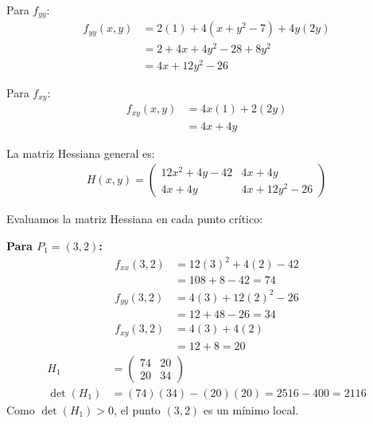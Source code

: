 \documentclass{article}
\begin{document}
Para $f_{yy}$:
\begin{align}
f_{yy}(x,y) &= 2(1) + 4(x + y^2 - 7) + 4y(2y) \\
&= 2 + 4x + 4y^2 - 28 + 8y^2 \\
&= 4x + 12y^2 - 26
\end{align}

Para $f_{xy}$:
\begin{align}
f_{xy}(x,y) &= 4x(1) + 2(2y) \\
&= 4x + 4y
\end{align}

La matriz Hessiana general es:
\begin{align}
H(x,y) = \begin{pmatrix} 
12x^2 + 4y - 42 & 4x + 4y \\
4x + 4y & 4x + 12y^2 - 26
\end{pmatrix}
\end{align}

Evaluamos la matriz Hessiana en cada punto crítico:

\textbf{Para $P_1 = (3, 2)$:}
\begin{align}
f_{xx}(3,2) &= 12(3)^2 + 4(2) - 42 \\
&= 108 + 8 - 42 = 74 \\
f_{yy}(3,2) &= 4(3) + 12(2)^2 - 26 \\
&= 12 + 48 - 26 = 34 \\
f_{xy}(3,2) &= 4(3) + 4(2) \\
&= 12 + 8 = 20
\end{align}
\begin{align}
H_1 &= \begin{pmatrix} 74 & 20 \\ 20 & 34 \end{pmatrix} \\
\det(H_1) &= (74)(34) - (20)(20) = 2516 - 400 = 2116
\end{align}
Como $\det(H_1) > 0$, el punto $(3,2)$ es un mínimo local.
\end{document}
